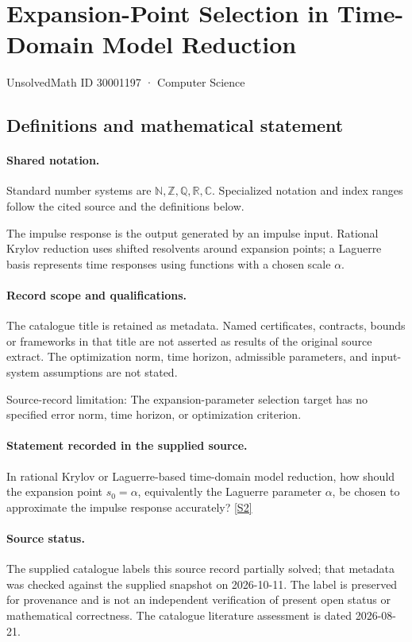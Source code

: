 \documentclass[11pt]{article}
\newcommand{\sref}[2]{\hyperlink{source:#1:#2}{[S#2]}}
\begin{document}
\setcounter{section}{30001196}
\section{Expansion-Point Selection in Time-Domain Model Reduction}\label{30001197}
{\small\sffamily UnsolvedMath ID 30001197 · Computer Science}
\subsection{Definitions and mathematical statement}

\paragraph{Shared notation.}Standard number systems are $\mathbb N,\mathbb Z,\mathbb Q,\mathbb R,\mathbb C$. Specialized notation and index ranges follow the cited source and the definitions below.


The impulse response is the output generated by an impulse input. Rational Krylov reduction uses shifted resolvents around expansion points; a Laguerre basis represents time responses using functions with a chosen scale $\alpha$.
\paragraph{Record scope and qualifications.}
The catalogue title is retained as metadata. Named certificates, contracts, bounds or frameworks in that title are not asserted as results of the original source extract.
The optimization norm, time horizon, admissible parameters, and input-system assumptions are not stated.

Source-record limitation: The expansion-parameter selection target has no specified error norm, time horizon, or optimization criterion.
\paragraph{Statement recorded in the supplied source.}
In rational Krylov or Laguerre-based time-domain model reduction, how should the expansion point $s_0=\alpha$, equivalently the Laguerre parameter $\alpha$, be chosen to approximate the impulse response accurately? \sref{30001197}{2}
\paragraph{Source status.}
The supplied catalogue labels this source record partially solved; that metadata was checked against the supplied snapshot on 2026-10-11. The label is preserved for provenance and is not an independent verification of present open status or mathematical correctness. The catalogue literature assessment is dated 2026-08-21.
\end{document}
